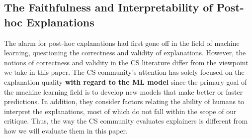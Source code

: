 \documentclass[mnsc,blindrev]{informs3}
\begin{document}
    \subsection{The Faithfulness and Interpretability of Post-hoc Explanations}
        \label{sec:cs_critique}
        The alarm for post-hoc explanations had first gone off in the field of machine learning, questioning the correctness and validity of explanations. However, the notions of correctness and validity in the CS literature differ from the viewpoint we take in this paper. The CS community's attention has solely focused on the explanation quality \textbf{with regard to the ML model} since the primary goal of the machine learning field is to develop new models that make better or faster predictions. In addition, they consider factors relating the ability of humans to interpret the explanations, most of which do not fall within the scope of our critique. Thus, the way the CS community evaluates explainers is different from how we will evaluate them in this paper.
\end{document}
